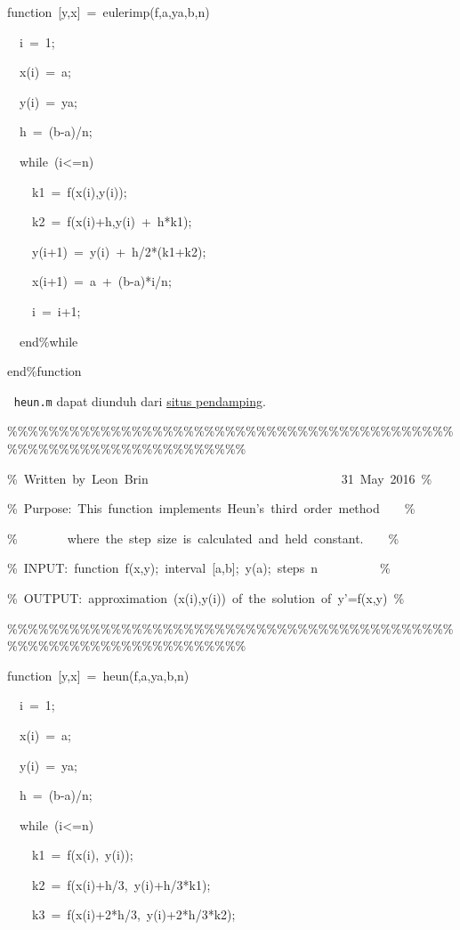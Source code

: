 \begin{description}
\begin{lyxcode}
function~{[}y,x{]}~=~eulerimp(f,a,ya,b,n)

~~i~=~1;

~~x(i)~=~a;

~~y(i)~=~ya;

~~h~=~(b-a)/n;

~~while~(i<=n)

~~~~k1~=~f(x(i),y(i));

~~~~k2~=~f(x(i)+h,y(i)~+~h{*}k1);

~~~~y(i+1)~=~y(i)~+~h/2{*}(k1+k2);

~~~~x(i+1)~=~a~+~(b-a){*}i/n;

~~~~i~=~i+1;

~~end\%while

end\%function
\end{lyxcode}
\item [{\ref{exc:ode-errorAnalysis-3}:}] $\ $
\texttt{heun.m} dapat diunduh dari \href{http://lqbrin.github.io/tea-time-numerical/ancillaries.html}{situs pendamping}.

\begin{lyxcode}
\%\%\%\%\%\%\%\%\%\%\%\%\%\%\%\%\%\%\%\%\%\%\%\%\%\%\%\%\%\%\%\%\%\%\%\%\%\%\%\%\%\%\%\%\%\%\%\%\%\%\%\%\%\%\%\%\%\%\%\%\%\%\%\%\%\%

\%~Written~by~Leon~Brin~~~~~~~~~~~~~~~~~~~~~~~~~~~~~~~31~May~2016~\%

\%~Purpose:~This~function~implements~Heun's~third~order~method~~~~\%

\%~~~~~~~~where~the~step~size~is~calculated~and~held~constant.~~~~\%

\%~INPUT:~function~f(x,y);~interval~{[}a,b{]};~y(a);~steps~n~~~~~~~~~~\%

\%~OUTPUT:~approximation~(x(i),y(i))~of~the~solution~of~y'=f(x,y)~\%

\%\%\%\%\%\%\%\%\%\%\%\%\%\%\%\%\%\%\%\%\%\%\%\%\%\%\%\%\%\%\%\%\%\%\%\%\%\%\%\%\%\%\%\%\%\%\%\%\%\%\%\%\%\%\%\%\%\%\%\%\%\%\%\%\%\%

function~{[}y,x{]}~=~heun(f,a,ya,b,n)

~~i~=~1;

~~x(i)~=~a;

~~y(i)~=~ya;

~~h~=~(b-a)/n;

~~while~(i<=n)

~~~~k1~=~f(x(i),~y(i));

~~~~k2~=~f(x(i)+h/3,~y(i)+h/3{*}k1);

~~~~k3~=~f(x(i)+2{*}h/3,~y(i)+2{*}h/3{*}k2);


\end{lyxcode}
\end{description}
